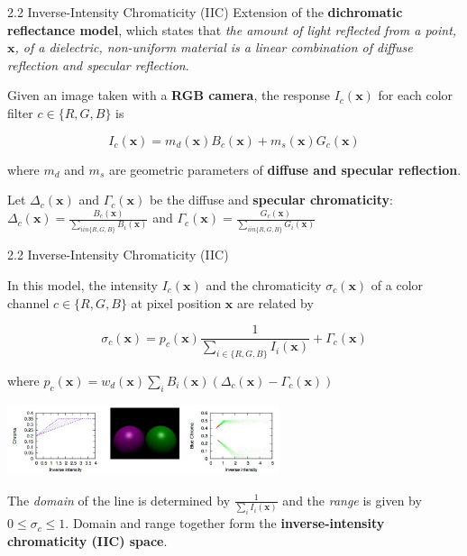 \begin{tframe}{2.2 Inverse-Intensity Chromaticity (IIC)}
Extension of the \textbf{dichromatic reflectance model}, which states that \emph{the amount of light reflected from a point, $\textbf{x}$, of a dielectric, non-uniform material is a linear combination of diffuse reflection and specular reflection}.

\vspace{0.2cm}

Given an image taken with a \textbf{RGB camera}, the response $I_c(\textbf{x})$ for each color filter $c \in \{R, G, B\}$ is

$$
I_c(\textbf{x}) = m_d(\textbf{x})B_c(\textbf{x}) + m_s(\textbf{x})G_c(\textbf{x})
$$

\begin{small}
where $m_d$ and $m_s$ are geometric parameters of \textbf{diffuse and specular reflection}.
\vspace{0.2cm}

Let $\Delta_c(\textbf{x})$ and $\Gamma_c(\textbf{x})$ be the diffuse and \textbf{specular chromaticity}: $\Delta_c(\textbf{x}) = \frac{B_c(\textbf{x})}{\sum_{i in \{R, G, B\}} B_i(\textbf{x})}$ and $\Gamma_c(\textbf{x}) = \frac{G_c(\textbf{x})}{\sum_{i in \{R, G, B\}} G_i(\textbf{x})}$
\end{small}

\end{tframe}

\begin{tframe}{2.2 Inverse-Intensity Chromaticity (IIC)}

In this model, the intensity $I_c(\textbf{x})$ and the chromaticity $\sigma_c(\textbf{x})$ of a color channel $c \in \{R, G, B\}$ at pixel position $\textbf{x}$ are related by

\begin{equation}
\sigma_c(\textbf{x}) = p_c(\textbf{x}) \frac{1}{\sum_{i \in \{R, G, B\}} I_i(\textbf{x})} + \Gamma_c(\textbf{x})
\end{equation}
\vspace{0.2cm}

\begin{small}
where $p_c(\textbf{x}) = w_d(\textbf{x}) \sum_i B_i(\textbf{x}) (\Delta_c(\textbf{x}) - \Gamma_c(\textbf{x}))$ 
\end{small}

\begin{center}
\includegraphics[width=0.6\textwidth]{images/iic.jpg}
\end{center}
The \emph{domain} of the line is determined by $\frac{1}{\sum_i I_i(\textbf{x})}$ and the \emph{range} is given by $0 \leq \sigma_c \leq 1$. Domain and range together form the \textbf{inverse-intensity chromaticity (IIC) space}.
\end{tframe}

